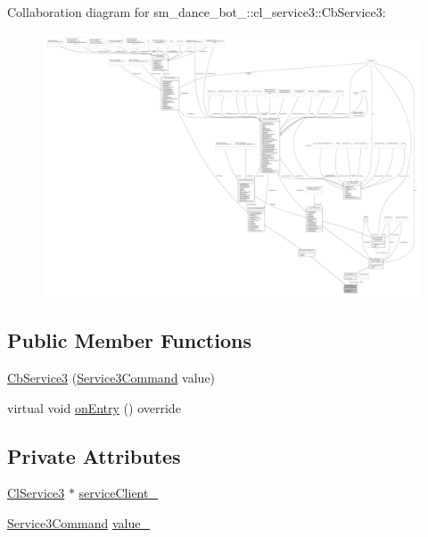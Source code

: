 Collaboration diagram for sm\+\_\+dance\+\_\+bot\+\_\+:\+:cl\+\_\+service3\+:\+:Cb\+Service3\+:
\nopagebreak
\begin{figure}[H]
\begin{center}
\leavevmode
\includegraphics[width=350pt]{classsm__dance__bot__2_1_1cl__service3_1_1CbService3__coll__graph}
\end{center}
\end{figure}
\subsection*{Public Member Functions}
\begin{DoxyCompactItemize}
\item 
\hyperlink{classsm__dance__bot__2_1_1cl__service3_1_1CbService3_a62be950b5107ee476814a27b99e6743c}{Cb\+Service3} (\hyperlink{namespacesm__dance__bot__2_1_1cl__service3_adfc3ce70a327b24b4fb6d6b02803caff}{Service3\+Command} value)
\item 
virtual void \hyperlink{classsm__dance__bot__2_1_1cl__service3_1_1CbService3_a179e43cc240f53f9c49c67094e41d75f}{on\+Entry} () override
\end{DoxyCompactItemize}
\subsection*{Private Attributes}
\begin{DoxyCompactItemize}
\item 
\hyperlink{classsm__dance__bot__2_1_1cl__service3_1_1ClService3}{Cl\+Service3} $\ast$ \hyperlink{classsm__dance__bot__2_1_1cl__service3_1_1CbService3_ac5fafa2528bba4c7411816dde044c48a}{service\+Client\+\_\+}
\item 
\hyperlink{namespacesm__dance__bot__2_1_1cl__service3_adfc3ce70a327b24b4fb6d6b02803caff}{Service3\+Command} \hyperlink{classsm__dance__bot__2_1_1cl__service3_1_1CbService3_ae48a64bc675b548fcb9c059831e39e37}{value\+\_\+}
\end{DoxyCompactItemize}
